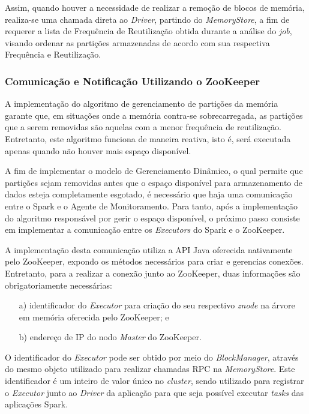 Assim, quando houver a necessidade de realizar a remoção de blocos de memória, realiza-se uma chamada direta ao \textit{Driver}, partindo do \textit{MemoryStore}, a fim de requerer a lista de Frequência de Reutilização obtida durante a análise do \textit{job}, visando ordenar as partições armazenadas de acordo com sua respectiva Frequência e Reutilização.

\subsubsection{Comunicação e Notificação Utilizando o ZooKeeper}
A implementação do algoritmo de gerenciamento de partições da memória garante que, em situações onde a memória contra-se sobrecarregada, as partições que a serem removidas são aquelas com a menor frequência de reutilização. Entretanto, este algoritmo funciona de maneira reativa, isto é, será executada apenas quando não houver mais espaço disponível. 

A fim de implementar o modelo de Gerenciamento Dinâmico, o qual permite que partições sejam removidas antes que o espaço disponível para armazenamento de dados esteja completamente esgotado, é necessário que haja uma comunicação entre o Spark e o Agente de Monitoramento. Para tanto, após a implementação do algoritmo responsável por gerir o espaço disponível, o próximo passo consiste em implementar a comunicação entre os \textit{Executors} do Spark e o ZooKeeper. 

A implementação desta comunicação utiliza a API Java oferecida nativamente pelo ZooKeeper, expondo os métodos necessários para criar e gerencias conexões. Entretanto, para a realizar a conexão junto ao ZooKeeper, duas informações são obrigatoriamente necessárias: 
\begin{enumerate}
    \item[a)] identificador do \textit{Executor} para criação do seu respectivo \textit{znode} na árvore em memória oferecida pelo  ZooKeeper; e
    \item[b)] endereço de IP do nodo \textit{Master} do ZooKeeper. 
\end{enumerate}

O identificador do \textit{Executor} pode ser obtido por meio do \textit{BlockManager}, através do mesmo objeto utilizado para realizar chamadas RPC na \textit{MemoryStore}. Este identificador é um inteiro de valor único no \textit{cluster}, sendo utilizado para registrar o \textit{Executor} junto ao \textit{Driver} da aplicação para que seja possível executar \textit{tasks} das aplicações Spark.

